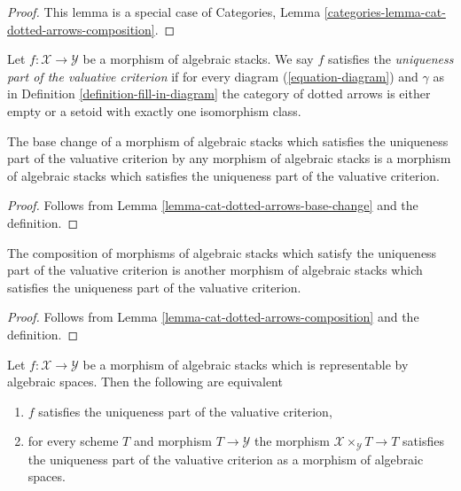 \begin{proof}
This lemma is a special case of Categories, 
Lemma \ref{categories-lemma-cat-dotted-arrows-composition}.
\end{proof}

\begin{definition}
\label{definition-uniqueness}
Let $f : \mathcal{X} \to \mathcal{Y}$ be a morphism of algebraic stacks.
We say $f$ satisfies the {\it uniqueness part of the valuative criterion}
if for every diagram (\ref{equation-diagram}) and $\gamma$
as in Definition \ref{definition-fill-in-diagram}
the category of dotted arrows is either empty or
a setoid with exactly one isomorphism class.
\end{definition}

\begin{lemma}
\label{lemma-base-change-uniqueness}
The base change of a morphism of algebraic stacks which satisfies the
uniqueness part of the valuative criterion by any morphism of
algebraic stacks is a morphism of algebraic stacks which satisfies the
uniqueness part of the valuative criterion.
\end{lemma}

\begin{proof}
Follows from Lemma \ref{lemma-cat-dotted-arrows-base-change}
and the definition.
\end{proof}

\begin{lemma}
\label{lemma-composition-uniqueness}
The composition of morphisms of algebraic stacks which satisfy the
uniqueness part of the valuative criterion is another
morphism of algebraic stacks which satisfies the
uniqueness part of the valuative criterion.
\end{lemma}

\begin{proof}
Follows from Lemma \ref{lemma-cat-dotted-arrows-composition}
and the definition.
\end{proof}

\begin{lemma}
\label{lemma-uniqueness-representable}
Let $f : \mathcal{X} \to \mathcal{Y}$ be a morphism of algebraic stacks
which is representable by algebraic spaces. Then the following are equivalent
\begin{enumerate}
\item $f$ satisfies the uniqueness part of the valuative criterion,
\item for every scheme $T$ and morphism $T \to \mathcal{Y}$
the morphism $\mathcal{X} \times_\mathcal{Y} T \to T$ satisfies
the uniqueness part of the valuative criterion as a morphism
of algebraic spaces.
\end{enumerate}
\end{lemma}

